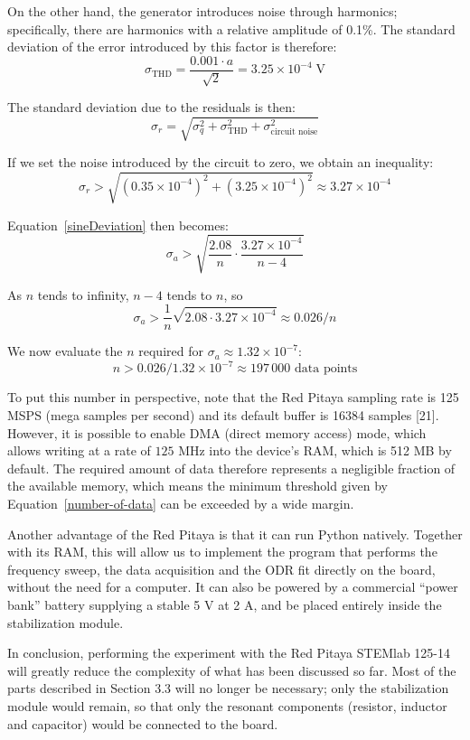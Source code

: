 \documentclass[12pt]{article}
\begin{document}
On the other hand, the generator introduces noise through harmonics; specifically, there are harmonics with a relative amplitude of 0.1\%. The standard deviation of the error introduced by this factor is therefore:
\begin{equation}
    \sigma_{\mathrm{THD}} = \frac{0.001 \cdot a}{\sqrt{2}} = 3.25\times 10^{-4}\;\mathrm{V}
\end{equation}

The standard deviation due to the residuals is then:
\begin{equation}
    \sigma_r = \sqrt{\sigma_q^2 + \sigma_{\mathrm{THD}}^2 + \sigma_{\text{circuit noise}}^2}
\end{equation}

If we set the noise introduced by the circuit to zero, we obtain an inequality:
\begin{equation}
    \sigma_r > \sqrt{(0.35\times 10^{-4})^2 + (3.25\times 10^{-4})^2} \approx 3.27\times 10^{-4}
\end{equation}

Equation~\eqref{sineDeviation} then becomes:
\begin{equation}
    \sigma_a > \sqrt{\frac{2.08}{n} \cdot \frac{3.27\times 10^{-4}}{n-4}}
\end{equation}

As $n$ tends to infinity, $n-4$ tends to $n$, so
\begin{equation}
    \sigma_a > \frac{1}{n}\sqrt{2.08 \cdot 3.27\times 10^{-4}} \approx 0.026 / n
\end{equation}

We now evaluate the $n$ required for $\sigma_a \approx 1.32\times 10^{-7}$:
\begin{equation} \label{number-of-data}
    n > 0.026/1.32\times 10^{-7} \approx 197\,000 \text{ data points}
\end{equation}

To put this number in perspective, note that the Red Pitaya sampling rate is 125 MSPS (mega samples per second) and its default buffer is 16384 samples [21]. However, it is possible to enable DMA (direct memory access) mode, which allows writing at a rate of $125\text{ MHz}$ into the device's RAM, which is 512 MB by default. The required amount of data therefore represents a negligible fraction of the available memory, which means the minimum threshold given by Equation~\eqref{number-of-data} can be exceeded by a wide margin.

Another advantage of the Red Pitaya is that it can run Python natively. Together with its RAM, this will allow us to implement the program that performs the frequency sweep, the data acquisition and the ODR fit directly on the board, without the need for a computer. It can also be powered by a commercial ``power bank'' battery supplying a stable 5 V at 2 A, and be placed entirely inside the stabilization module.

In conclusion, performing the experiment with the Red Pitaya STEMlab 125-14 will greatly reduce the complexity of what has been discussed so far. Most of the parts described in Section 3.3 will no longer be necessary; only the stabilization module would remain, so that only the resonant components (resistor, inductor and capacitor) would be connected to the board.
\end{document}
